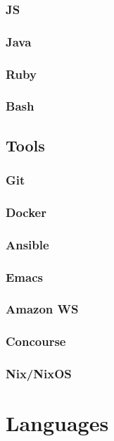 \documentclass[11pt]{article}
\begin{document}
\subsubsection*{JS}
\label{sec:org31d7b41}
\subsubsection*{Java}
\label{sec:org610acdf}
\subsubsection*{Ruby}
\label{sec:orgbd11463}
\subsubsection*{Bash}
\label{sec:org3b5ae57}
\subsection*{Tools}
\label{sec:org144be24}
\subsubsection*{Git}
\label{sec:orgb837fb4}
\subsubsection*{Docker}
\label{sec:org7b177c4}
\subsubsection*{Ansible}
\label{sec:orgf827ef8}
\subsubsection*{Emacs}
\label{sec:org50487e4}
\subsubsection*{Amazon WS}
\label{sec:org2b75698}
\subsubsection*{Concourse}
\label{sec:org7b770f5}
\subsubsection*{Nix/NixOS}
\label{sec:org1060ca7}
\section*{Languages}
\label{sec:orgbca13a7}
\end{document}
